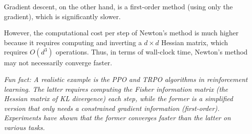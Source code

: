 \documentclass[11pt, a4paper, oneside]{memoir}
\begin{document}
Gradient descent, on the other hand, is a first-order method (using only the gradient),
which is significantly slower.

However, the computational cost per step of Newton's method is much higher
because it requires computing and inverting a $d \times d$ Hessian matrix,
which requires $O(d^3)$ operations. Thus, in terms of wall-clock time, Newton's method may not necessarily converge faster.

\textit{Fun fact: A realistic example is the PPO and TRPO algorithms in reinforcement learning.
The latter requires computing the Fisher information matrix (the Hessian matrix of KL divergence) each step,
while the former is a simplified version that only needs a constrained gradient information (first-order).
Experiments have shown that the former converges faster than the latter on various tasks.}
\label{LastPage}
\end{document}
